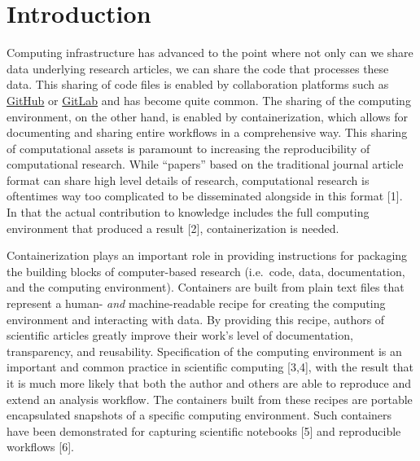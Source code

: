 \documentclass[10pt,letterpaper]{article}
\begin{document}

\linenumbers

\hypertarget{introduction}{%
\section*{Introduction}\label{introduction}}

Computing infrastructure has advanced to the point where not only can we
share data underlying research articles, we can share the code that
processes these data. This sharing of code files is enabled by
collaboration platforms such as \href{https://github.com}{GitHub} or
\href{https://gitlab.com}{GitLab} and has become quite common. The
sharing of the computing environment, on the other hand, is enabled by
containerization, which allows for documenting and sharing entire
workflows in a comprehensive way. This sharing of computational assets
is paramount to increasing the reproducibility of computational
research. While ``papers'' based on the traditional journal article
format can share high level details of research, computational research
is oftentimes way too complicated to be disseminated alongside in this
format {[}1{]}. In that the actual contribution to knowledge includes
the full computing environment that produced a result {[}2{]},
containerization is needed.

Containerization plays an important role in providing instructions for
packaging the building blocks of computer-based research (i.e.~code,
data, documentation, and the computing environment). Containers are
built from plain text files that represent a human- \emph{and}
machine-readable recipe for creating the computing environment and
interacting with data. By providing this recipe, authors of scientific
articles greatly improve their work's level of documentation,
transparency, and reusability. Specification of the computing
environment is an important and common practice in scientific computing
{[}3,4{]}, with the result that it is much more likely that both the
author and others are able to reproduce and extend an analysis workflow.
The containers built from these recipes are portable encapsulated
snapshots of a specific computing environment. Such containers have been
demonstrated for capturing scientific notebooks {[}5{]} and reproducible
workflows {[}6{]}.
\end{document}
